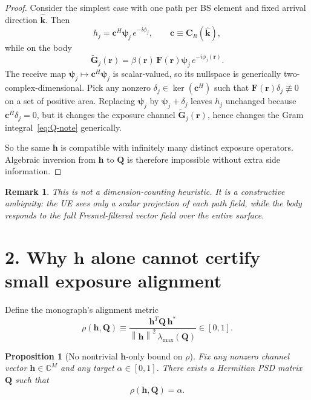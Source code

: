 \documentclass[11pt]{article}
\newtheorem{proposition}{Proposition}
\newtheorem{remark}{Remark}
\newcommand{\Complex}{\mathbb{C}}
\newcommand{\hh}{\mathbf{h}}
\newcommand{\QQ}{\mathbf{Q}}
\newcommand{\Gh}{\widetilde{\mathbf{G}}}
\newcommand{\psin}{\boldsymbol{\psi}}
\newcommand{\norm}[1]{\left\lVert #1 \right\rVert}
\begin{document}
\begin{proof}
Consider the simplest case with one path per BS element and fixed arrival
direction $\hat{\mathbf{k}}$. Then
\begin{equation}
  h_j = \mathbf{c}^H \psin_j\,e^{-i\phi_j},
  \qquad
  \mathbf{c} \equiv \mathbf{C}_R(\hat{\mathbf{k}}),
\end{equation}
while on the body
\begin{equation}
  \Gh_j(\mathbf{r})
  = \beta(\mathbf{r})\,\mathbf{F}(\mathbf{r})\psin_j\,e^{-i\phi_j(\mathbf{r})}.
\end{equation}
The receive map $\psin_j \mapsto \mathbf{c}^H\psin_j$ is scalar-valued, so
its nullspace is generically two-complex-dimensional. Pick any nonzero
$\delta_j \in \ker(\mathbf{c}^H)$ such that
$\mathbf{F}(\mathbf{r})\delta_j \not\equiv 0$ on a set of positive area.
Replacing $\psin_j$ by $\psin_j+\delta_j$ leaves $h_j$ unchanged because
$\mathbf{c}^H\delta_j=0$, but it changes the exposure channel
$\Gh_j(\mathbf{r})$, hence changes the Gram integral~\eqref{eq:Q-note}
generically.

So the same $\hh$ is compatible with infinitely many distinct exposure
operators. Algebraic inversion from $\hh$ to $\QQ$ is therefore impossible
without extra side information.
\end{proof}

\begin{remark}
This is not a dimension-counting heuristic. It is a constructive ambiguity:
the UE sees only a scalar projection of each path field, while the body
responds to the full Fresnel-filtered vector field over the entire surface.
\end{remark}

\section*{2. Why $\hh$ alone cannot certify small exposure alignment}

Define the monograph's alignment metric
\begin{equation}
  \rho(\hh,\QQ)
  \equiv
  \frac{\hh^T\QQ\,\hh^*}
  {\norm{\hh}^2\,\lambda_{\max}(\QQ)}
  \in [0,1].
\end{equation}

\begin{proposition}[No nontrivial $\hh$-only bound on $\rho$]
Fix any nonzero channel vector $\hh \in \Complex^M$ and any target
$\alpha \in [0,1]$. There exists a Hermitian PSD matrix $\QQ$ such that
\begin{equation}
  \rho(\hh,\QQ)=\alpha.
\end{equation}
\end{proposition}
\end{document}
